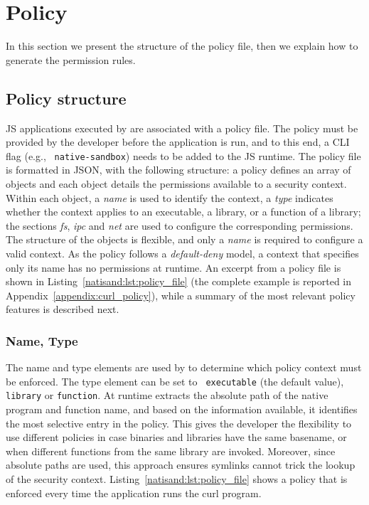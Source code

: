 \section{Policy}
\label{natisand:sect:policy}

In this section we present the structure of the policy file, then we
explain how to generate the permission rules.

\subsection{Policy structure}
\label{sect:sci-ffi-policy-structure}

JS applications executed by \pap are associated with a policy
file. The policy must be provided by the developer before the
application is run, and to this end, a CLI flag (e.g., {\tt
  native-sandbox}) needs to be added to the JS runtime. The policy
file is formatted in JSON, with the following structure: a policy
defines an array of objects and each object details the permissions
available to a security context.  Within each object, a {\em name} is
used to identify the context, a {\em type} indicates whether the
context applies to an executable, a library, or a function of a
library; the sections {\em fs}, {\em ipc} and {\em net} are used to
configure the corresponding permissions. The structure of the objects
is flexible, and only a {\em name} is required to configure a valid
context. As the policy follows a {\em default-deny} model, a context
that specifies only its name has no permissions at runtime. An excerpt
from a policy file is shown in Listing~\ref{natisand:lst:policy_file} (the
complete example is reported in Appendix~\ref{appendix:curl_policy}),
while a summary of the most relevant policy features is described
next.

\subsubsection*{Name, Type}

The name and type elements are used by \pap to determine which policy
context must be enforced. The type element can be set to {\tt
  executable} (the default value), {\tt library} or {\tt function}.
At runtime \pap extracts the absolute path of the native program and function
name, and based on the information available, it identifies the most
selective entry in the policy. This gives the developer the
flexibility to use different policies in case binaries and libraries
have the same basename, or when different functions
from the same library are invoked. Moreover, since absolute
paths are used, this approach ensures symlinks cannot trick the lookup
of the security context. Listing~\ref{natisand:lst:policy_file} shows
a policy that is enforced every time the application runs the curl
program.

